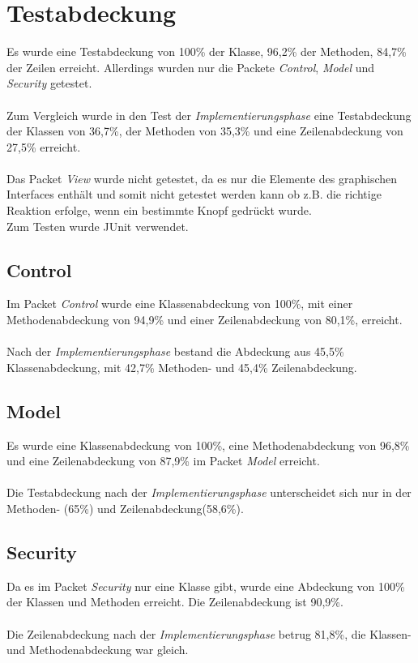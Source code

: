 \section{Testabdeckung}
Es wurde eine Testabdeckung von 100\% der Klasse, 96,2\% der Methoden, 84,7\% der Zeilen erreicht. Allerdings wurden nur die Packete \emph{Control}, \emph{Model} und \emph{Security} getestet.\\\\
Zum Vergleich wurde in den Test der \emph{Implementierungsphase} eine Testabdeckung der Klassen von 36,7\%, der Methoden von 35,3\% und eine Zeilenabdeckung von 27,5\% erreicht.
\\\\
Das Packet \emph{View} wurde nicht getestet, da es nur die Elemente des graphischen Interfaces enthält und somit nicht getestet werden kann ob z.B. die richtige Reaktion erfolge, wenn ein bestimmte Knopf gedrückt wurde.\\

Zum Testen wurde JUnit verwendet.

\subsection{Control}
Im Packet \emph{Control} wurde eine Klassenabdeckung von 100\%, mit einer Methodenabdeckung von 94,9\% und einer Zeilenabdeckung von 80,1\%, erreicht.\\\\
Nach der \emph{Implementierungsphase} bestand die Abdeckung aus 45,5\% Klassenabdeckung, mit 42,7\% Methoden- und 45,4\% Zeilenabdeckung.

\subsection{Model}
Es wurde eine Klassenabdeckung von 100\%, eine Methodenabdeckung von 96,8\% und eine Zeilenabdeckung von 87,9\% im Packet \emph{Model} erreicht.\\\\
Die Testabdeckung nach der \emph{Implementierungsphase} unterscheidet sich nur in der Methoden- (65\%) und Zeilenabdeckung(58,6\%).

\subsection{Security}
Da es im Packet \emph{Security} nur eine Klasse gibt, wurde eine Abdeckung von 100\% der Klassen und Methoden erreicht. Die Zeilenabdeckung ist 90,9\%.\\\\
Die Zeilenabdeckung nach der \emph{Implementierungsphase} betrug 81,8\%, die Klassen- und Methodenabdeckung war gleich.
